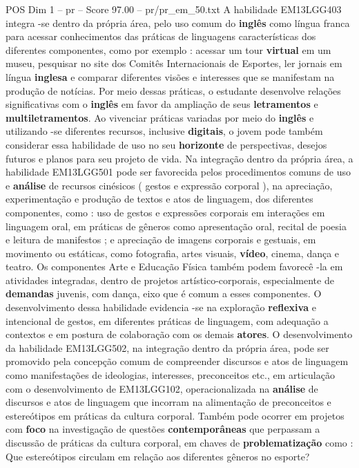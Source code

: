 \begin{textsample}{POS Dim 1 – pr – Score 97.00 – pr/pr\_em\_50.txt}
A habilidade EM13LGG403 integra -se dentro da própria área, pelo uso comum do \textbf{inglês} como língua franca para acessar conhecimentos das práticas de linguagens características dos diferentes componentes, como por exemplo : acessar um tour \textbf{virtual} em um museu, pesquisar no site dos Comitês Internacionais de Esportes, ler jornais em língua \textbf{inglesa} e comparar diferentes visões e interesses que se manifestam na produção de notícias.
Por meio dessas práticas, o estudante desenvolve relações significativas com o \textbf{inglês} em favor da ampliação de seus \textbf{letramentos} e \textbf{multiletramentos}.
Ao vivenciar práticas variadas por meio do \textbf{inglês} e utilizando -se diferentes recursos, inclusive \textbf{digitais}, o jovem pode também considerar essa habilidade de uso no seu \textbf{horizonte} de perspectivas, desejos futuros e planos para seu projeto de vida.
Na integração dentro da própria área, a habilidade EM13LGG501 pode ser favorecida pelos procedimentos comuns de uso e \textbf{análise} de recursos cinésicos ( gestos e expressão corporal ), na apreciação, experimentação e produção de textos e atos de linguagem, dos diferentes componentes, como : uso de gestos e expressões corporais em interações em linguagem oral, em práticas de gêneros como apresentação oral, recital de poesia e leitura de manifestos ; e apreciação de imagens corporais e gestuais, em movimento ou estáticas, como fotografia, artes visuais, \textbf{vídeo}, cinema, dança e teatro.
Os componentes Arte e Educação Física também podem favorecê -la em atividades integradas, dentro de projetos artístico-corporais, especialmente de \textbf{demandas} juvenis, com dança, eixo que é comum a esses componentes.
O desenvolvimento dessa habilidade evidencia -se na exploração \textbf{reflexiva} e intencional de gestos, em diferentes práticas de linguagem, com adequação a contextos e em postura de colaboração com os demais \textbf{atores}.
O desenvolvimento da habilidade EM13LGG502, na integração dentro da própria área, pode ser promovido pela concepção comum de compreender discursos e atos de linguagem como manifestações de ideologias, interesses, preconceitos etc., em articulação com o desenvolvimento de EM13LGG102, operacionalizada na \textbf{análise} de discursos e atos de linguagem que incorram na alimentação de preconceitos e estereótipos em práticas da cultura corporal.
Também pode ocorrer em projetos com \textbf{foco} na investigação de questões \textbf{contemporâneas} que perpassam a discussão de práticas da cultura corporal, em chaves de \textbf{problematização} como : Que estereótipos circulam em relação aos diferentes gêneros no esporte?

\end{textsample}
